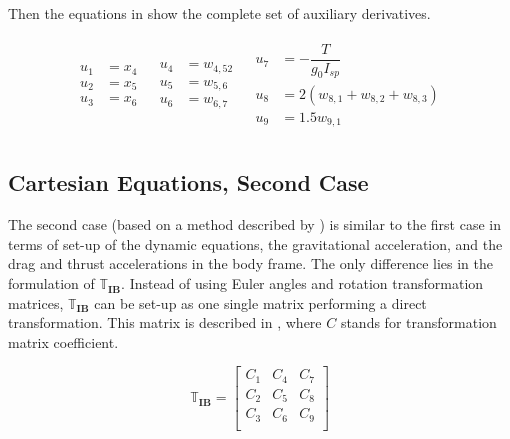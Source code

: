 \noindent
Then the equations in  show the complete set of auxiliary derivatives.

\begin{align} \label{eq:restAuxD}
\begin{split}
u_{1} &= x_{4} \\
u_{2} &= x_{5} \\
u_{3} &= x_{6} \\
\end{split}
&
\begin{split}
u_{4} &= w_{4,52} \\
u_{5} &= w_{5,6} \\
u_{6} &= w_{6,7} \\
\end{split}
&
\begin{split}
u_{7} &= -\dfrac{T}{g_{0}I_{sp}} \\
u_{8} &= 2\left(w_{8,1}+w_{8,2}+w_{8,3}\right)\\
u_{9} &= 1.5 w_{9,1} \\
\end{split}
\end{align}

 
\subsection{Cartesian Equations, Second Case}
\label{subsec:careq2}
The second case (based on a method described by \citep{bergsma2015application}) is similar to the first case in terms of set-up of the dynamic equations, the gravitational acceleration, and the drag and thrust accelerations in the body frame. The only difference lies in the formulation of $\mathbb{T}_{\mathbf{IB}}$. Instead of using Euler angles and rotation transformation matrices, $\mathbb{T}_{\mathbf{IB}}$ can be set-up as one single matrix performing a direct transformation. This matrix is described in , where $C$ stands for transformation matrix coefficient. 

\begin{equation} \label{eq:transMatCoef}
\mathbb{T}_{\mathbf{IB}} = 
\left[
\begin{matrix}
C_{1} & C_{4} & C_{7} \\
C_{2} & C_{5} & C_{8} \\
C_{3} & C_{6} & C_{9} \\
\end{matrix}
\right]
\end{equation}

